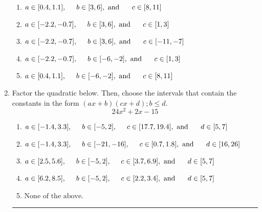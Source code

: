 \documentclass[14pt]{extbook}
\newcommand{\litem}[1]{\item#1\hspace*{-1cm}\rule{\textwidth}{0.4pt}}
\begin{document}
\begin{enumerate}
{\begin{center}
\end{center}
\begin{enumerate}[label=\Alph*.]
\item \( a \in [0.4, 1.1], \hspace*{5mm} b \in [3, 6], \text{ and } \hspace*{5mm} c \in [8, 11] \)
\item \( a \in [-2.2, -0.7], \hspace*{5mm} b \in [3, 6], \text{ and } \hspace*{5mm} c \in [1, 3] \)
\item \( a \in [-2.2, -0.7], \hspace*{5mm} b \in [3, 6], \text{ and } \hspace*{5mm} c \in [-11, -7] \)
\item \( a \in [-2.2, -0.7], \hspace*{5mm} b \in [-6, -2], \text{ and } \hspace*{5mm} c \in [1, 3] \)
\item \( a \in [0.4, 1.1], \hspace*{5mm} b \in [-6, -2], \text{ and } \hspace*{5mm} c \in [8, 11] \)

\end{enumerate} }
\litem{
Factor the quadratic below. Then, choose the intervals that contain the constants in the form $(ax+b)(cx+d); b \leq d.$\[ 24x^{2} +2 x -15 \]\begin{enumerate}[label=\Alph*.]
\item \( a \in [-1.4, 3.3], \hspace*{5mm} b \in [-5, 2], \hspace*{5mm} c \in [17.7, 19.4], \text{ and } \hspace*{5mm} d \in [5, 7] \)
\item \( a \in [-1.4, 3.3], \hspace*{5mm} b \in [-21, -16], \hspace*{5mm} c \in [0.7, 1.8], \text{ and } \hspace*{5mm} d \in [16, 26] \)
\item \( a \in [2.5, 5.6], \hspace*{5mm} b \in [-5, 2], \hspace*{5mm} c \in [3.7, 6.9], \text{ and } \hspace*{5mm} d \in [5, 7] \)
\item \( a \in [6.2, 8.5], \hspace*{5mm} b \in [-5, 2], \hspace*{5mm} c \in [2.2, 3.4], \text{ and } \hspace*{5mm} d \in [5, 7] \)
\item \( \text{None of the above.} \)


\end{enumerate}}
\end{enumerate}
\end{document}

